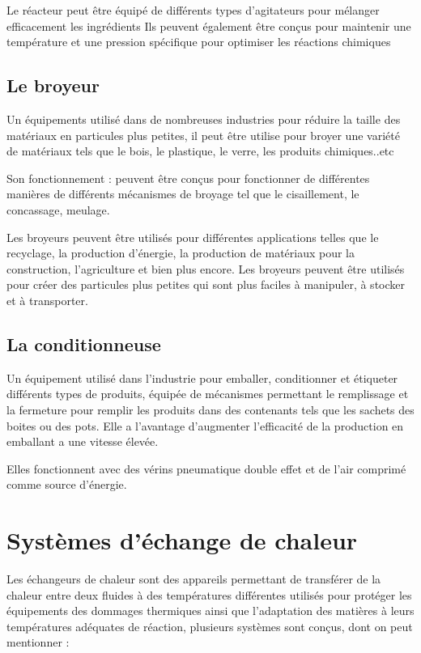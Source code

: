 \documentclass[20pt,a4paper]{report}
\begin{document}
\begin{large}
Le réacteur peut être équipé de différents types d’agitateurs pour mélanger efficacement les ingrédients  
Ils peuvent également être conçus pour maintenir une température et une pression spécifique pour optimiser les réactions chimiques



		\section{Le broyeur}
Un équipements utilisé dans de nombreuses industries pour réduire la taille des matériaux en particules plus petites, il peut être utilise pour broyer une variété de matériaux tels que le bois, le plastique, le verre, les produits chimiques..etc

Son fonctionnement : peuvent être conçus pour fonctionner de différentes manières de différents mécanismes de broyage tel que le cisaillement, le concassage, meulage.

Les broyeurs peuvent être utilisés pour différentes applications telles que le recyclage, la production d'énergie, la production de matériaux pour la construction, l'agriculture et bien plus encore. Les broyeurs peuvent être utilisés pour créer des particules plus petites qui sont plus faciles à manipuler, à stocker et à transporter.

		\section{La conditionneuse }
Un équipement utilisé dans l’industrie pour emballer, conditionner et étiqueter différents types de produits, équipée de mécanismes permettant le remplissage et la fermeture pour remplir les produits dans des contenants tels que les sachets des boites ou des pots. Elle a l’avantage d’augmenter l’efficacité de la production en emballant a une vitesse élevée.

Elles fonctionnent avec des vérins pneumatique double effet et de l’air comprimé comme source d’énergie.

\newpage


	\chapter{Systèmes d’échange de chaleur}
	
	\newpage

Les échangeurs de chaleur sont des appareils permettant de transférer de la chaleur entre deux fluides à des températures différentes utilisés pour protéger les équipements des dommages thermiques ainsi que l’adaptation des matières à leurs températures adéquates de réaction, plusieurs systèmes sont conçus, dont on peut mentionner :


\end{large}
\end{document}
